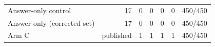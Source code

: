 \begin{table}[t]
{\begin{tabular}{lrrrrrr}
Answer-only control & 17 & 0 & 0 & 0 & 0 & 450/450 \\
Answer-only (corrected set) & 17 & 0 & 0 & 0 & 0 & 450/450 \\
Arm C & published & 1 & 1 & 1 & 1 & 450/450 \\

\end{tabular}}
\end{table}
